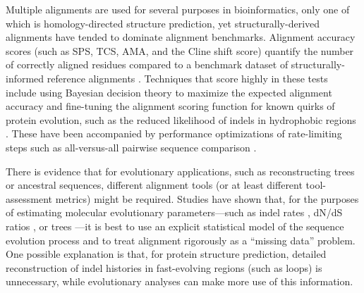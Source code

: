 \documentclass{bioinfo}
\begin{document}
Multiple alignments are used for several purposes in bioinformatics,
only one of which is homology-directed structure prediction,
yet structurally-derived alignments have tended to dominate alignment benchmarks.
Alignment accuracy scores (such as SPS, TCS, AMA, and the Cline shift score) quantify the number of correctly aligned residues
compared to a benchmark dataset of structurally-informed reference alignments \citep{ThompsonEtAl2005}.
Techniques that score highly in these tests include using Bayesian decision theory to maximize the expected
alignment accuracy \citep{NotredameEtAl2000,DoEtAl2005,SchwartzPachter2007,BradleyEtAl2009}
and fine-tuning the alignment scoring function for known quirks of
protein evolution, such as the reduced likelihood of indels in
hydrophobic regions \citep{KatohEtAl2005,Edgar2004b,LarkinEtAl2007}.
These have been accompanied by performance optimizations of 
rate-limiting steps such as all-versus-all pairwise sequence comparison \citep{BradleyEtAl2009,Edgar2004b}.

There is evidence that for evolutionary applications, such as reconstructing trees or ancestral sequences,
different alignment tools (or at least different tool-assessment metrics) might be required.
Studies have shown that, for the purposes of estimating
molecular evolutionary parameters---such as indel rates \citep{Westesson2012-zg},
dN/dS ratios \citep{Redelings2014},
or trees \citep{LoytynojaGoldman2008}---it is best to use an explicit statistical model of the sequence evolution process
and to treat alignment rigorously as a ``missing data'' problem.
One possible explanation is that, for protein structure prediction,
detailed reconstruction of indel histories in fast-evolving regions (such as loops) is unnecessary,
while evolutionary analyses can make more use of this information.
\end{document}
